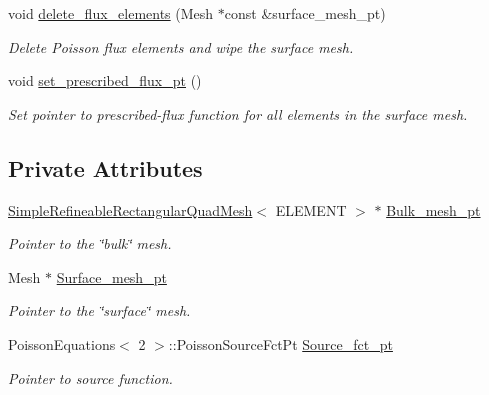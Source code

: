 \begin{DoxyCompactItemize}
void \hyperlink{classRefineableTwoMeshFluxPoissonProblem_ab35087cadc6dbc7a602441b9a986d650}{delete\+\_\+flux\+\_\+elements} (Mesh $\ast$const \&surface\+\_\+mesh\+\_\+pt)
\begin{DoxyCompactList}\small\item\em Delete Poisson flux elements and wipe the surface mesh. \end{DoxyCompactList}\item 
void \hyperlink{classRefineableTwoMeshFluxPoissonProblem_aa0aeec40bbdb0649e309e51ad96e5da7}{set\+\_\+prescribed\+\_\+flux\+\_\+pt} ()
\begin{DoxyCompactList}\small\item\em Set pointer to prescribed-\/flux function for all elements in the surface mesh. \end{DoxyCompactList}\end{DoxyCompactItemize}
\subsection*{Private Attributes}
\begin{DoxyCompactItemize}
\item 
\hyperlink{classSimpleRefineableRectangularQuadMesh}{Simple\+Refineable\+Rectangular\+Quad\+Mesh}$<$ E\+L\+E\+M\+E\+NT $>$ $\ast$ \hyperlink{classRefineableTwoMeshFluxPoissonProblem_a35746600caac7fd5b1a2ccec6beff8d6}{Bulk\+\_\+mesh\+\_\+pt}
\begin{DoxyCompactList}\small\item\em Pointer to the \char`\"{}bulk\char`\"{} mesh. \end{DoxyCompactList}\item 
Mesh $\ast$ \hyperlink{classRefineableTwoMeshFluxPoissonProblem_a1ad7c5a406b267f2d79c52b3d347971d}{Surface\+\_\+mesh\+\_\+pt}
\begin{DoxyCompactList}\small\item\em Pointer to the \char`\"{}surface\char`\"{} mesh. \end{DoxyCompactList}\item 
Poisson\+Equations$<$ 2 $>$\+::Poisson\+Source\+Fct\+Pt \hyperlink{classRefineableTwoMeshFluxPoissonProblem_a0f3434b437ca4b5e6a97ecae9e826477}{Source\+\_\+fct\+\_\+pt}
\begin{DoxyCompactList}\small\item\em Pointer to source function. \end{DoxyCompactList}\end{DoxyCompactItemize}



